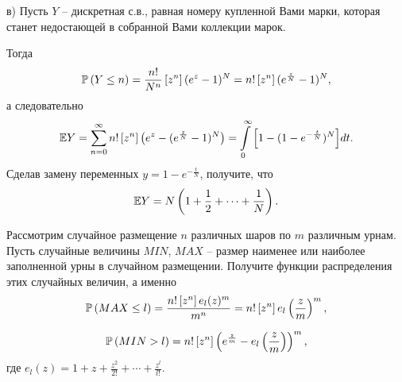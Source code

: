 \begin{ordre}
в) Пусть $Y$ -- дискретная с.в., равная номеру купленной Вами 
марки, которая станет недостающей в собранной Вами коллекции марок.

Тогда $$\mathrm{{\mathbb P}} \left ( Y\le n \right ) =\frac{n!}{N^n}\left[ {z^n} \right](e^z-1)^N=n!\left[ 
{z^n} \right](e^{\frac{z}{N}}-1)^N,$$ а следовательно 
$$\mathrm{{\mathbb E}} Y=\sum\limits_{n=0}^\infty {n!\left[ {z^n} \right]\left( 
{e^z-(e^{\frac{z}{N}}-1)^N} \right)} =\int\limits_0^\infty {\left[ 
{1-(1-e^{-\frac{t}{N}})^N} \right]} dt.$$
Сделав замену переменных 
$y=1-e^{-\frac{t}{N}}$, получите, что $$\mathrm{{\mathbb E}} Y=N\left( {1+\frac{1}{2}+\cdots 
+\frac{1}{N}} \right). $$

\end{ordre}

\begin{problem}

Рассмотрим случайное размещение $n$ различных шаров по $m$ различным урнам. 
Пусть случайные величины $MIN$, $MAX$ -- размер наименее или наиболее заполненной 
урны в случайном размещении. Получите функции распределения этих случайных 
величин, а именно $$\mathrm{{\mathbb P}} \left ( MAX\le l\right ) =\frac{n!\left[ {z^n} \right]e_l 
(z)^m}{m^n}=n!\left[ {z^n} \right]e_l \left( {\frac{z}{m}} \right)^m,$$

$$\mathrm{{\mathbb P}}\left ( MIN>l\right ) =n!\left[ {z^n} \right]\left( {e^{\frac{z}{m}}-e_l \left( 
{\frac{z}{m}} \right)} \right)^m,
$$
где $e_l (z)=1+z+\frac{z^2}{2!}+\cdots 
+\frac{z^l}{l!}$.

\end{problem}



